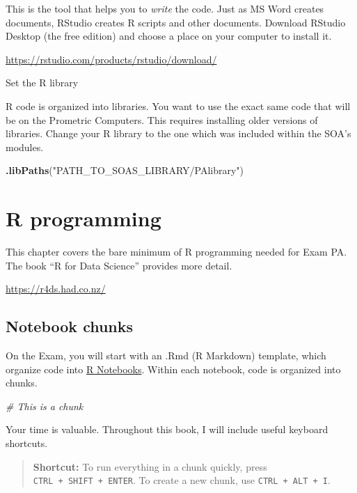 \documentclass[openany]{book}
\newenvironment{Shaded}{\begin{snugshade}}{\end{snugshade}}
\newcommand{\CommentTok}[1]{\textcolor[rgb]{0.56,0.35,0.01}{\textit{#1}}}
\newcommand{\KeywordTok}[1]{\textcolor[rgb]{0.13,0.29,0.53}{\textbf{#1}}}
\newcommand{\NormalTok}[1]{#1}
\newcommand{\StringTok}[1]{\textcolor[rgb]{0.31,0.60,0.02}{#1}}
\begin{document}
This is the tool that helps you to \emph{write} the code. Just as MS Word creates documents, RStudio creates R scripts and other documents. Download RStudio Desktop (the free edition) and choose a place on your computer to install it.

\url{https://rstudio.com/products/rstudio/download/}

Set the R library

R code is organized into libraries. You want to use the exact same code that will be on the Prometric Computers. This requires installing older versions of libraries. Change your R library to the one which was included within the SOA's modules.

\begin{Shaded}
\begin{Highlighting}[]
\KeywordTok{.libPaths}\NormalTok{(}\StringTok{"PATH_TO_SOAS_LIBRARY/PAlibrary"}\NormalTok{)}
\end{Highlighting}
\end{Shaded}

\hypertarget{r-programming}{%
\chapter{R programming}\label{r-programming}}

This chapter covers the bare minimum of R programming needed for Exam PA. The book
``R for Data Science'' provides more detail.

\url{https://r4ds.had.co.nz/}

\hypertarget{notebook-chunks}{%
\section{Notebook chunks}\label{notebook-chunks}}

On the Exam, you will start with an .Rmd (R Markdown) template, which organize
code into \href{https://bookdown.org/yihui/rmarkdown/notebook.html}{R Notebooks}.
Within each notebook, code is organized into chunks.

\begin{Shaded}
\begin{Highlighting}[]
\CommentTok{# This is a chunk}
\end{Highlighting}
\end{Shaded}

Your time is valuable. Throughout this book, I will include useful keyboard shortcuts.

\begin{quote}
\textbf{Shortcut:} To run everything in a chunk quickly, press \texttt{CTRL\ +\ SHIFT\ +\ ENTER}.
To create a new chunk, use \texttt{CTRL\ +\ ALT\ +\ I}.
\end{quote}
\end{document}
